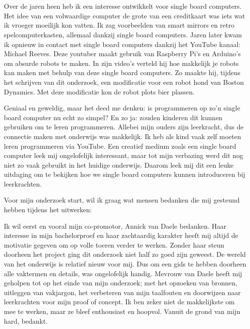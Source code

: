 
\chapter*{}
\label{ch:voorwoord}


Over de jaren heen heb ik een interesse ontwikkelt voor single board computers. Het idee van een volwaardige computer de grote van een creditkaart was iets wat ik vroeger moeilijk kon vatten. Ik zag voorbeelden van smart mirrors en retro spelcomputerkasten, allemaal dankzij single board computers. Jaren later kwam ik opnieuw in contact met single board computers dankzij het YouTube kanaal: Michael Reeves. Deze youtuber maakt gebruik van Raspberry Pi's en Arduino's om absurde robots te maken. In zijn video's verteld hij hoe makkelijk je robots kan maken met behulp van deze single board computers.  Zo maakte hij, tijdens het schrijven van dit onderzoek, een modificatie voor een robot hond van Boston Dynamics. Met deze modificatie kon de robot plots bier plassen. 

Geniaal en geweldig, maar het deed me denken: is programmeren op zo'n single board computer nu echt zo simpel? En zo ja: zouden kinderen dit kunnen gebruiken om te leren programmeren. Allebei mijn ouders zijn leerkracht, dus de connectie maken met onderwijs was makkelijk. Ik heb als kind vaak zelf moeten leren programmeren via YouTube. Een creatief medium zoals een single board computer leek mij ongelofelijk interessant, maar tot mijn verbazing werd dit nog niet zo vaak gebruikt in het huidige onderwijs. Daarom leek mij dit een leuke uitdaging om te bekijken hoe we single board computers kunnen introduceren bij leerkrachten.

Voor mijn onderzoek start, wil ik graag wat mensen bedanken die mij gesteund hebben tijdens het uitwerken:

Ik wil eerst en vooral mijn co-promotor, Annick van Daele bedanken. Haar interesse in mijn bachelorproef en haar zachtaardig karakter heeft mij altijd de motivatie gegeven om op volle toeren verder te werken. Zonder haar steun doorheen het project ging dit onderzoek niet half zo goed zijn geweest. De wereld van het onderwijs is relatief nieuw voor mij. Dus om een gids te hebben doorheen alle vaktermen en details, was ongelofelijk handig. Mevrouw van Daele heeft mij geholpen tot op het einde van mijn onderzoek; met het opzoeken van bronnen, uitleggen van vakjargon, het verbeteren van mijn taalfouten en doorwijzen naar leerkrachten voor mijn proof of concept. Ik ben zeker niet de makkelijkste om mee te werken, maar ze bleef enthousiast en hoopvol. Vanuit de grond van mijn hard, bedankt.

